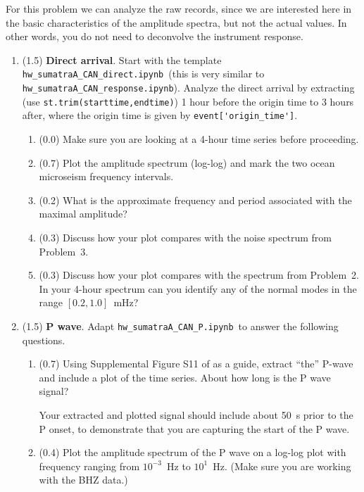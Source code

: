 \documentclass[11pt,titlepage,fleqn]{article}
\newcommand{\tfileresponse}{{\tt hw\_sumatraA\_CAN\_response.ipynb}}
\newcommand{\tfileP}{{\tt hw\_sumatraA\_CAN\_P.ipynb}}
\newcommand{\tfiledirect}{{\tt hw\_sumatraA\_CAN\_direct.ipynb}}
\begin{document}
For this problem we can analyze the raw records, since we are interested here in the basic characteristics of the amplitude spectra, but not the actual values. In other words, you do not need to deconvolve the instrument response.


\begin{enumerate}
\item (1.5) {\bf Direct arrival}. 
Start with the template \tfiledirect\ (this is very similar to \tfileresponse).
Analyze the direct arrival by extracting (use \verb+st.trim(starttime,endtime)+) 1 hour before the origin time to 3 hours after, where the origin time is given by \verb+event['origin_time']+.

\begin{enumerate}
\item (0.0) Make sure you are looking at a 4-hour time series before proceeding.
\item (0.7) Plot the amplitude spectrum (log-log) and mark the two ocean microseism frequency intervals.
\item (0.2) What is the approximate frequency and period associated with the maximal amplitude?
\item (0.3) Discuss how your plot compares with the noise spectrum from Problem~3.
\item (0.3) Discuss how your plot compares with the spectrum from Problem~2. \\
In your 4-hour spectrum can you identify any of the normal modes in the range $[0.2,1.0]$~mHz?
\end{enumerate}


\item (1.5) {\bf P wave}. Adapt \tfileP\ to answer the following questions.
%
\begin{enumerate}
\item (0.7) Using Supplemental Figure S11 of \citet{Ammon2005} as a guide, extract ``the'' P-wave and include a plot of the time series. About how long is the P wave signal?

Your extracted and plotted signal should include about 50~s prior to the P onset, to demonstrate that you are capturing the start of the P wave.

\item (0.4) Plot the amplitude spectrum of the P wave on a log-log plot with frequency ranging from $10^{-3}$~Hz to $10^1$~Hz. (Make sure you are working with the BHZ data.)


\end{enumerate}
\end{enumerate}
\end{document}
